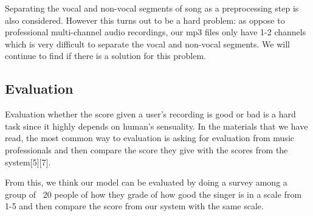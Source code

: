 \documentclass[paper=a4, fontsize=11pt, DIV=13]{scrartcl}
\begin{document}
Separating the vocal and non-vocal segments of song as a preprocessing step is also considered. However this turns out to be a hard problem: as oppose to professional multi-channel audio recordings, our mp3 files only have 1-2 channels which is very difficult to separate the vocal and non-vocal segments. We will continue to find if there is a solution for this problem.

\subsection{Evaluation}

Evaluation whether the score given a user's recording is good or bad is a hard task since it highly depends on human's sensuality. In the materials that we have read, the most common way to evaluation is asking for evaluation from music professionals and then compare the score they give with the scores from the system[5][7]. 

From this, we think our model can be evaluated by doing a survey among a group of ~20 people of how they grade of how good the singer is in a scale from 1-5 and then compare the score from our system with the same scale.
\end{document}
